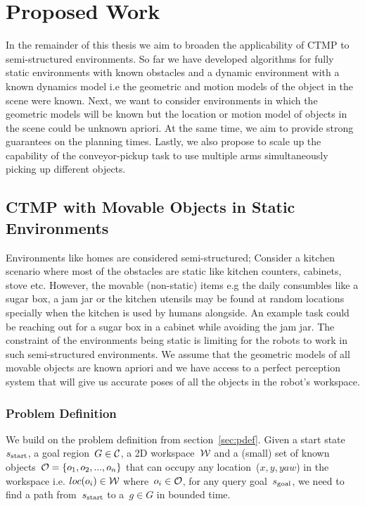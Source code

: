 \documentclass[a4paper]{report}
\begin{document}
\chapter{Proposed Work}
In the remainder of this thesis we aim to broaden the applicability of CTMP to semi-structured environments. So far we have developed algorithms for fully static environments with known obstacles and a dynamic environment with a known dynamics model i.e the geometric and motion models of the object in the scene were known. Next, we want to consider environments in which the geometric models will be known but the location or motion model of objects in the scene could be unknown apriori. At the same time, we aim to provide strong guarantees on the planning times. Lastly, we also propose to scale up the capability of the conveyor-pickup task to use multiple arms simultaneously picking up different objects.

\section{CTMP with Movable Objects in Static Environments}
Environments like homes are considered semi-structured; Consider a kitchen scenario where most of the obstacles are static like kitchen counters, cabinets, stove etc. However, the movable (non-static) items e.g the daily consumbles like a sugar box, a jam jar or the kitchen utensils may be found at random locations specially when the kitchen is used by humans alongside. An example task could be reaching out for a sugar box in a cabinet while avoiding the jam jar.
The constraint of the environments being static is limiting for the robots to work in such semi-structured environments. We assume that the geometric models of all movable objects are known apriori and we have access to a perfect perception system that will give us accurate poses of all the objects in the robot's workspace.

\subsection{Problem Definition}
We build on the problem definition from section~\ref{sec:pdef}. Given a start state~$s_{\text{start}}$, a goal region~$G \in \mathcal{C}$, a 2D workspace~$\mathcal{W}$ and a (small) set of known objects~$\mathcal{O} = \{o_1, o_2, ..., o_n\}$ that can occupy any location~($x,y,yaw$) in the workspace i.e. $loc(o_i) \in \mathcal{W}$ where~$o_i \in \mathcal{O}$, for any query goal~$s_{\text{goal}}$, we need to find a path from~$s_{\text{start}}$ to a~$g \in G$ in bounded time.
\end{document}
